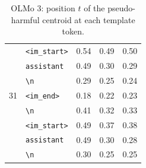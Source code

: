 \begin{table}[!htbp]
\begin{tabular}{llccc}
 & \texttt{\textless{}\textbar{}im\_start\textbar{}\textgreater{}} & 0.54 & 0.49 & 0.50 \\
 & \texttt{assistant} & 0.49 & 0.30 & 0.29 \\
 & \texttt{\textbackslash n} & 0.29 & 0.25 & 0.24 \\
\midrule
31 & \texttt{\textless{}\textbar{}im\_end\textbar{}\textgreater{}} & 0.18 & 0.22 & 0.23 \\
 & \texttt{\textbackslash n} & 0.41 & 0.32 & 0.33 \\
 & \texttt{\textless{}\textbar{}im\_start\textbar{}\textgreater{}} & 0.49 & 0.37 & 0.38 \\
 & \texttt{assistant} & 0.49 & 0.30 & 0.28 \\
 & \texttt{\textbackslash n} & 0.30 & 0.25 & 0.25 \\
\bottomrule
\end{tabular}
\caption{OLMo 3: position $t$ of the pseudo-harmful centroid at each template token.}
\label{tab:centroid_template_olmo3}
\end{table}
